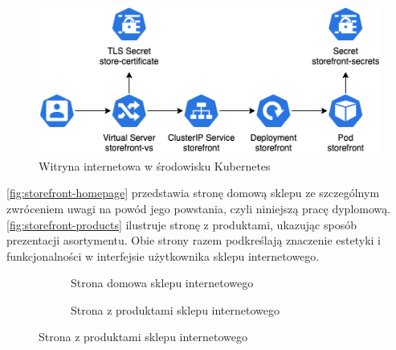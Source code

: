 \begin{figure}[H]
    \centering
    \includegraphics[width=\textwidth]{img/kubernetes-storefront}
    \caption{Witryna internetowa w środowisku Kubernetes}
    \label{fig:kubernetes-storefront}
\end{figure}

\autoref{fig:storefront-homepage} przedstawia stronę domową sklepu ze szczególnym zwróceniem uwagi na powód jego powstania, czyli niniejszą pracę dyplomową.
\autoref{fig:storefront-products} ilustruje stronę z produktami, ukazując sposób prezentacji asortymentu.
Obie strony razem podkreślają znaczenie estetyki i funkcjonalności w interfejsie użytkownika sklepu internetowego.

\begin{figure}[p]
    \begin{figure}[H]
        \centering
        \caption{Strona domowa sklepu internetowego}
        \label{fig:storefront-homepage}
    \end{figure}

    \begin{figure}[H]
        \centering
        \caption{Strona z produktami sklepu internetowego}
        \label{fig:storefront-products}
    \end{figure}
\end{figure}

